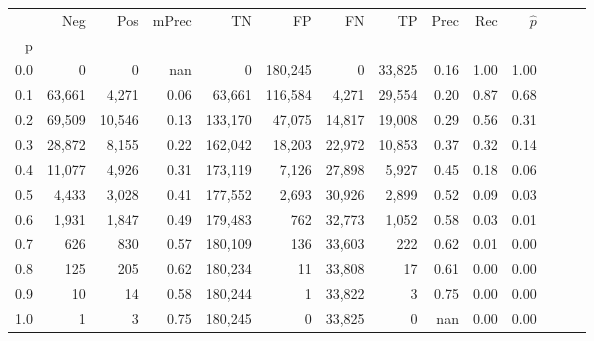 \begin{tabular}{rrrrrrrrrrrrrr}
\toprule
{} &     Neg &     Pos & mPrec &       TN &       FP &      FN &      TP &  Prec &   Rec & $\hat{p}$ \\
p   &         &         &       &          &          &         &         &       &       &           \\
\midrule
0.0 &       0 &       0 &   nan &        0 &  180,245 &       0 &  33,825 &  0.16 &  1.00 &      1.00 \\
0.1 &  63,661 &   4,271 &  0.06 &   63,661 &  116,584 &   4,271 &  29,554 &  0.20 &  0.87 &      0.68 \\
0.2 &  69,509 &  10,546 &  0.13 &  133,170 &   47,075 &  14,817 &  19,008 &  0.29 &  0.56 &      0.31 \\
0.3 &  28,872 &   8,155 &  0.22 &  162,042 &   18,203 &  22,972 &  10,853 &  0.37 &  0.32 &      0.14 \\
0.4 &  11,077 &   4,926 &  0.31 &  173,119 &    7,126 &  27,898 &   5,927 &  0.45 &  0.18 &      0.06 \\
0.5 &   4,433 &   3,028 &  0.41 &  177,552 &    2,693 &  30,926 &   2,899 &  0.52 &  0.09 &      0.03 \\
0.6 &   1,931 &   1,847 &  0.49 &  179,483 &      762 &  32,773 &   1,052 &  0.58 &  0.03 &      0.01 \\
0.7 &     626 &     830 &  0.57 &  180,109 &      136 &  33,603 &     222 &  0.62 &  0.01 &      0.00 \\
0.8 &     125 &     205 &  0.62 &  180,234 &       11 &  33,808 &      17 &  0.61 &  0.00 &      0.00 \\
0.9 &      10 &      14 &  0.58 &  180,244 &        1 &  33,822 &       3 &  0.75 &  0.00 &      0.00 \\
1.0 &       1 &       3 &  0.75 &  180,245 &        0 &  33,825 &       0 &   nan &  0.00 &      0.00 \\
\bottomrule
\end{tabular}
